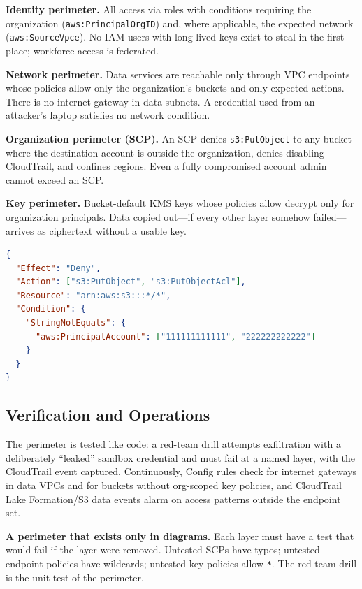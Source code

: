 \textbf{Identity perimeter.} All access via roles with conditions requiring the organization (\texttt{aws:PrincipalOrgID}) and, where applicable, the expected network (\texttt{aws:SourceVpce}). No IAM users with long-lived keys exist to steal in the first place; workforce access is federated.

\textbf{Network perimeter.} Data services are reachable only through VPC endpoints whose policies allow only the organization's buckets and only expected actions. There is no internet gateway in data subnets. A credential used from an attacker's laptop satisfies no network condition.

\textbf{Organization perimeter (SCP).} An SCP denies \texttt{s3:PutObject} to any bucket where the destination account is outside the organization, denies disabling CloudTrail, and confines regions. Even a fully compromised account admin cannot exceed an SCP.

\textbf{Key perimeter.} Bucket-default KMS keys whose policies allow decrypt only for organization principals. Data copied out---if every other layer somehow failed---arrives as ciphertext without a usable key.

\begin{lstlisting}[language=json,caption={The anti-exfiltration SCP: deny S3 writes to non-organization accounts.},label={lst:ch21-scp}]
{
  "Effect": "Deny",
  "Action": ["s3:PutObject", "s3:PutObjectAcl"],
  "Resource": "arn:aws:s3:::*/*",
  "Condition": {
    "StringNotEquals": {
      "aws:PrincipalAccount": ["111111111111", "222222222222"]
    }
  }
}
\end{lstlisting}

\subsection{Verification and Operations}
The perimeter is tested like code: a red-team drill attempts exfiltration with a deliberately ``leaked'' sandbox credential and must fail at a named layer, with the CloudTrail event captured. Continuously, Config rules check for internet gateways in data VPCs and for buckets without org-scoped key policies, and CloudTrail Lake Formation/S3 data events alarm on access patterns outside the endpoint set.

\begin{pitfall}
\textbf{A perimeter that exists only in diagrams.} Each layer must have a test that would fail if the layer were removed. Untested SCPs have typos; untested endpoint policies have wildcards; untested key policies allow \texttt{*}. The red-team drill is the unit test of the perimeter.
\end{pitfall}


